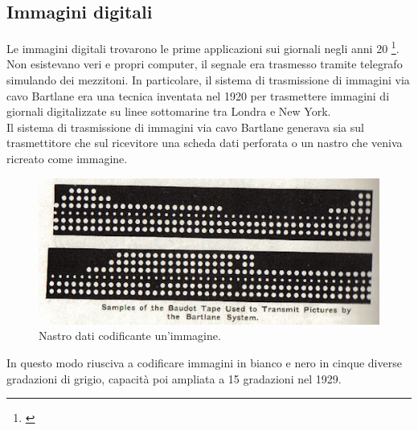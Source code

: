 \subsection{Immagini digitali}
Le immagini digitali trovarono le prime applicazioni sui giornali negli anni 20 \footnote{\cite{storia}}. Non esistevano veri e propri computer, il segnale era trasmesso tramite telegrafo simulando dei mezzitoni.
In particolare, il sistema di trasmissione di immagini via cavo Bartlane era una tecnica inventata nel 1920 per trasmettere immagini di giornali digitalizzate su linee sottomarine tra Londra e New York.\\
Il sistema di trasmissione di immagini via cavo Bartlane generava sia sul trasmettitore che sul ricevitore una scheda dati perforata o un nastro che veniva ricreato come immagine.\\
\begin{figure}[htb] \centering
\includegraphics[scale=0.6, trim = 0 1.1cm 0 0, clip]{Pictures/nastro Bartlane.jpg}
\caption{Nastro dati codificante un'immagine.}\label{fig:figura}
\end{figure}

\noindent
In questo modo riusciva a codificare immagini in bianco e nero in cinque diverse gradazioni di grigio, capacità poi ampliata a 15 gradazioni nel 1929.

